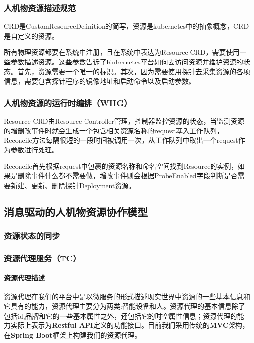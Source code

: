 \documentclass[12pt,a4paper]{article}
\theoremstyle{definition}
\begin{document}
\subsubsection{人机物资源描述规范}
CRD是CustomResourceDefinition的简写，资源是kubernetes中的抽象概念，CRD是自定义的资源。

所有物理资源都要在系统中注册，且在系统中表达为Resource CRD，需要使用一些参数描述资源。这些参数告诉了Kubernetes平台如何去访问资源并维护资源的状态。首先，资源需要一个唯一的标识。其次，因为需要使用探针去采集资源的各项信息，需要包含探针程序的镜像地址和启动命令以及启动参数。
\subsubsection{人机物资源的运行时编排（WHG）}
Resource CRD由Resource Controller管理，控制器监控资源的状态，当监测资源的增删改事件时就会生成一个包含相关资源名称的request塞入工作队列，Reconcile方法每隔很短的一段时间被调用一次，从工作队列中取出一个request作为参数进行处理。

Reconcile首先根据request中包裹的资源名称和命名空间找到Resource的实例，如果是删除事件什么都不需要做，增改事件则会根据ProbeEnabled字段判断是否需要新建、更新、删除探针Deployment资源。
\subsection{消息驱动的人机物资源协作模型}
\subsubsection{资源状态的同步}
\subsubsection{资源代理服务（TC）}
\paragraph{资源代理描述}
资源代理在我们的平台中是以微服务的形式描述现实世界中资源的一些基本信息和它具有的能力，资源代理主要分为两类:智能设备和人。资源代理的基本信息除了包括id,品牌和它的一些基本属性之外，还包括它的时空属性信息；资源代理的能力实际上表示为\textbf{Restful API}定义的功能接口。目前我们采用传统的\textbf{MVC}架构，在\textbf{Spring Boot}框架上构建我们的资源代理。
\end{document}

